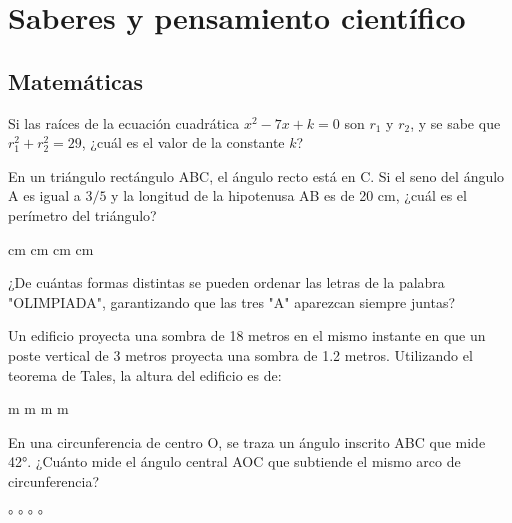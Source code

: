 \documentclass[12pt]{evaluasep}
\begin{document}
\begin{questions}
\begin{choices}
    \end{choices}
    

    	\section{Saberes y pensamiento científico}
\subsection{Matemáticas}

\question Si las raíces de la ecuación cuadrática $x^2 - 7x + k = 0$ son $r_1$ y $r_2$, y se sabe que $r_1^2 + r_2^2 = 29$, ¿cuál es el valor de la constante $k$?
    \begin{choices}
    \end{choices}

    \question En un triángulo rectángulo ABC, el ángulo recto está en C. Si el seno del ángulo A es igual a $3/5$ y la longitud de la hipotenusa AB es de 20 cm, ¿cuál es el perímetro del triángulo?
    \begin{choices}
         cm
         cm
         cm 
         cm
    \end{choices}

    \question ¿De cuántas formas distintas se pueden ordenar las letras de la palabra "OLIMPIADA", garantizando que las tres "A" aparezcan siempre juntas?

    \begin{choices}
    \end{choices}

    \newpage

    \question Un edificio proyecta una sombra de 18 metros en el mismo instante en que un poste vertical de 3 metros proyecta una sombra de 1.2 metros. Utilizando el teorema de Tales, la altura del edificio es de:
    \begin{choices}
         m
         m
         m 
         m
    \end{choices}

    \question En una circunferencia de centro O, se traza un ángulo inscrito ABC que mide 42°. ¿Cuánto mide el ángulo central AOC que subtiende el mismo arco de circunferencia?
    \begin{choices}
        °
        °
        °
        ° 
    \end{choices}


\end{questions}
\end{document}
